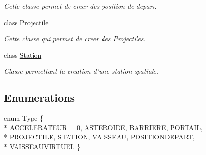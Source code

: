 \begin{DoxyCompactItemize}
\begin{DoxyCompactList}\small\item\em Cette classe permet de creer des position de depart. \end{DoxyCompactList}\item 
class \hyperlink{class_projectile}{Projectile}
\begin{DoxyCompactList}\small\item\em Cette classe qui permet de creer des Projectiles. \end{DoxyCompactList}\item 
class \hyperlink{class_station}{Station}
\begin{DoxyCompactList}\small\item\em Classe permettant la creation d'une station spatiale. \end{DoxyCompactList}\end{DoxyCompactItemize}
\subsection*{Enumerations}
\begin{DoxyCompactItemize}
\item 
enum \hyperlink{group___i_n_f2990-04_ga1d1cfd8ffb84e947f82999c682b666a7}{Type} \{ \\*
\hyperlink{group___i_n_f2990-04_gga1d1cfd8ffb84e947f82999c682b666a7ad73f17b1aa5cd7285a1cdb594f68d59d}{A\-C\-C\-E\-L\-E\-R\-A\-T\-E\-U\-R} = 0, 
\hyperlink{group___i_n_f2990-04_gga1d1cfd8ffb84e947f82999c682b666a7a765b4beedd062b711f2032888adf8e98}{A\-S\-T\-E\-R\-O\-I\-D\-E}, 
\hyperlink{group___i_n_f2990-04_gga1d1cfd8ffb84e947f82999c682b666a7ab3e2158b2759e7e20adeb1f66bf3eeaa}{B\-A\-R\-R\-I\-E\-R\-E}, 
\hyperlink{group___i_n_f2990-04_gga1d1cfd8ffb84e947f82999c682b666a7af67d667409cf70aa767dc17e21f6f24d}{P\-O\-R\-T\-A\-I\-L}, 
\\*
\hyperlink{group___i_n_f2990-04_gga1d1cfd8ffb84e947f82999c682b666a7a8801cf11e9d369feeb5db84413660623}{P\-R\-O\-J\-E\-C\-T\-I\-L\-E}, 
\hyperlink{group___i_n_f2990-04_gga1d1cfd8ffb84e947f82999c682b666a7abe1ce018b886341a69d81ead8cffc786}{S\-T\-A\-T\-I\-O\-N}, 
\hyperlink{group___i_n_f2990-04_gga1d1cfd8ffb84e947f82999c682b666a7a25460e5e6da4129ee78425bcb07d3728}{V\-A\-I\-S\-S\-E\-A\-U}, 
\hyperlink{group___i_n_f2990-04_gga1d1cfd8ffb84e947f82999c682b666a7a2f952a15c8e35280108b9602c28bc5c2}{P\-O\-S\-I\-T\-I\-O\-N\-D\-E\-P\-A\-R\-T}, 
\\*
\hyperlink{group___i_n_f2990-04_gga1d1cfd8ffb84e947f82999c682b666a7a444cb64e6c072bd4f7962984bf490566}{V\-A\-I\-S\-S\-E\-A\-U\-V\-I\-R\-T\-U\-E\-L}
 \}
\end{DoxyCompactItemize}

